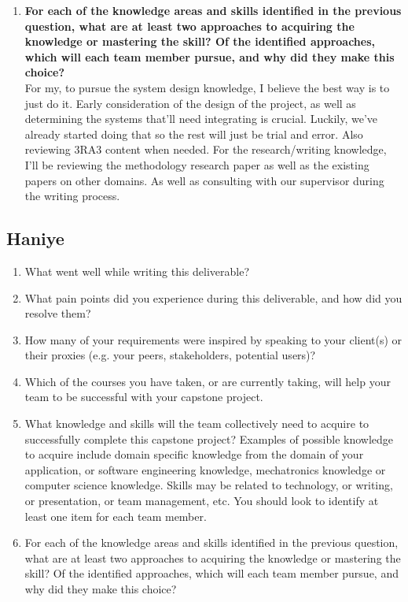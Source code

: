 \begin{enumerate}
{  least one item for each team member.} \\
  I think the team needs to acquire system design knowledge. Although we've all had experience working adding/updating features of pre-existing projects, starting a completely new one and having to think of all the design requirements will be hard. Additionally, due to the research section, we'll also need to get research, and by expansion, writing knowledge.
  \item \textbf{For each of the knowledge areas and skills identified in the previous
  question, what are at least two approaches to acquiring the knowledge or
  mastering the skill?  Of the identified approaches, which will each team
  member pursue, and why did they make this choice?} \\
  For my, to pursue the system design knowledge, I believe the best way is to just do it. Early consideration of the design of the project, as well as determining the systems that'll need integrating is crucial. Luckily, we've already started doing that so the rest will just be trial and error. Also reviewing 3RA3 content when needed.
  For the research/writing knowledge, I'll be reviewing the methodology research paper as well as the existing papers on other domains. As well as consulting with our supervisor during the writing process.
\end{enumerate}
\subsection*{Haniye}
\begin{enumerate}
  \item What went well while writing this deliverable?
  \item What pain points did you experience during this deliverable, and how did
  you resolve them?
  \item How many of your requirements were inspired by speaking to your
  client(s) or their proxies (e.g. your peers, stakeholders, potential users)?
  \item Which of the courses you have taken, or are currently taking, will help
  your team to be successful with your capstone project.
  \item What knowledge and skills will the team collectively need to acquire to
  successfully complete this capstone project?  Examples of possible knowledge
  to acquire include domain specific knowledge from the domain of your
  application, or software engineering knowledge, mechatronics knowledge or
  computer science knowledge.  Skills may be related to technology, or writing,
  or presentation, or team management, etc.  You should look to identify at
  least one item for each team member.
  \item For each of the knowledge areas and skills identified in the previous
  question, what are at least two approaches to acquiring the knowledge or
  mastering the skill?  Of the identified approaches, which will each team
  member pursue, and why did they make this choice?
\end{enumerate}
